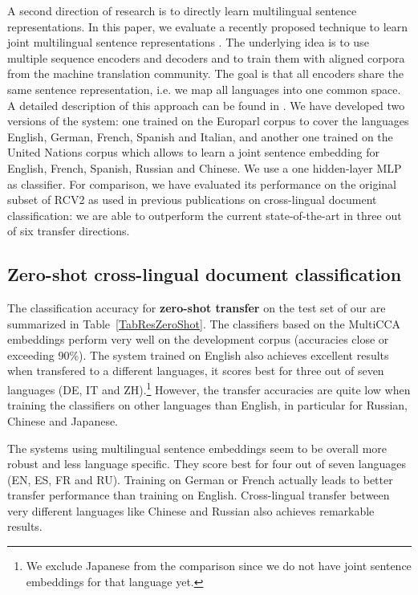 \documentclass[10pt, a4paper]{article}
\begin{document}
A second direction of research is to directly learn multilingual sentence
representations.
In this paper, we evaluate a recently proposed technique to learn joint
multilingual sentence representations \cite{Schwenk:2017:repl4nlp}.
The underlying idea is to use multiple
sequence encoders and decoders and to train them with aligned corpora from the
machine translation community. The goal is that all encoders share the same
sentence representation, i.e. we map all languages into one common space.  A
detailed description of this approach can be found in
\cite{Schwenk:2017:repl4nlp}.
We have developed two versions of the system:
one trained on the Europarl
corpus \cite{Koehn:2005:mtsummit_eurparl} to cover the languages
English, German, French, Spanish and Italian, and another one trained on the
United Nations corpus \cite{Ziemski:2016:lrec_unv1} which allows to learn a
joint sentence embedding for English, French, Spanish, Russian and Chinese.
We use a one hidden-layer MLP as classifier.
For comparison, we
have evaluated its performance on the original subset of RCV2 as used in previous publications on
cross-lingual document classification: we are able to outperform the current state-of-the-art in three out of six transfer directions.

\subsection{Zero-shot cross-lingual document classification}

The classification accuracy for \textbf{zero-shot transfer} on the test set of our \mldcc{} are summarized in Table~\ref{TabResZeroShot}.
The classifiers based on the MultiCCA embeddings perform very well on the development corpus (accuracies close or exceeding 90\%). The system trained on English also achieves excellent results when transfered to a different languages, it scores best for three out of seven languages (DE, IT and ZH).\footnote{We exclude Japanese from the comparison since we do not have joint sentence embeddings for that language yet.}
However, the transfer accuracies are quite low when training the classifiers on other languages than English, in particular for Russian, Chinese and Japanese.

The systems using multilingual sentence embeddings seem to be overall more robust and less language specific. They score best for four out of seven languages (EN, ES, FR and RU). Training on German or French actually leads to better transfer performance than training on English.
Cross-lingual transfer between very different languages like Chinese and Russian also achieves remarkable results.
\end{document}

